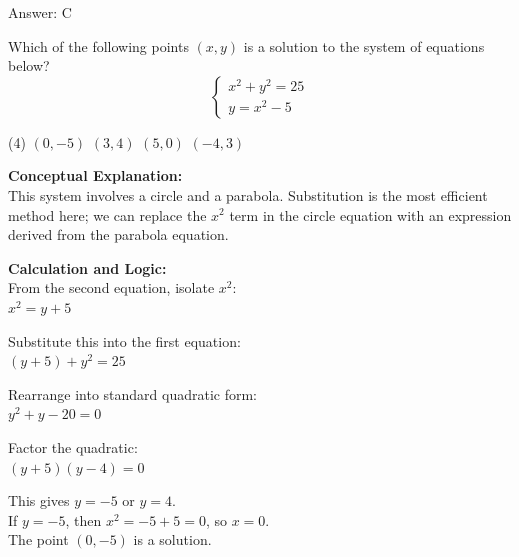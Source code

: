 \documentclass[11pt,paper=a4,answers]{exam}
\begin{document}
\begin{questions}
\begin{solution}
\vspace{25pt}

Answer: \colorbox{yellow!100}{C}
\end{solution}

\vspace{40pt}

\question
Which of the following points $(x, y)$ is a solution to the system of equations below?
\[ \begin{cases} x^2 + y^2 = 25 \\ y = x^2 - 5 \end{cases} \]
\begin{tasks}(4)
    \task $(0, -5)$
    \task $(3, 4)$
    \task $(5, 0)$
    \task $(-4, 3)$
\end{tasks}

\begin{solution}
\textbf{Conceptual Explanation:} \\
This system involves a circle and a parabola. Substitution is the most efficient method here; we can replace the $x^2$ term in the circle equation with an expression derived from the parabola equation.

\vspace{20pt}

\textbf{Calculation and Logic:} \\
From the second equation, isolate $x^2$: \\
$x^2 = y + 5$

\vspace{10pt}

Substitute this into the first equation: \\
$(y + 5) + y^2 = 25$

\vspace{10pt}

Rearrange into standard quadratic form: \\
$y^2 + y - 20 = 0$

\vspace{10pt}

Factor the quadratic: \\
$(y + 5)(y - 4) = 0$

\vspace{10pt}

This gives $y = -5$ or $y = 4$. \\
If $y = -5$, then $x^2 = -5 + 5 = 0$, so $x = 0$. \\
The point $(0, -5)$ is a solution.


\end{solution}
\end{questions}
\end{document}

